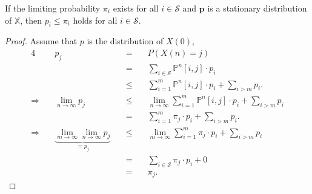 \begin{inequality} \label{ineq:p-le-pi}
If the limiting probability $ \pi_{i} $ exists for all $ i \in \mathcal{S} $ and $ \mathbf{p} $ is a stationary distribution of $ \mathbb{X} $, then $ p_{i} \le \pi_{i} $ holds for all $ i \in \mathcal{S} $.

\begin{proof}
Assume that $ p $ is the distribution of $ X(0) $,
\begin{alignat*}{4}
  & p_{j}
    & \quad=\quad & P(X(n) = j) \\
  & & \quad=\quad & \sum_{i \in \mathcal{S}} \mathbb{P}^{n}[i, j] \cdot p_{i} \\
  & & \quad\le\quad & \sum_{i = 1}^{m} \mathbb{P}^{n}[i, j] \cdot p_{i} + \sum_{i > m} p_{i}. \\
\Rightarrow\quad
  & \lim_{n \to \infty} p_{j}
    & \quad\le\quad & \lim_{n \to \infty} \sum_{i = 1}^{m} \mathbb{P}^{n}[i, j] \cdot p_{i} + \sum_{i > m} p_{i} \\
  & & \quad=\quad & \sum_{i = 1}^{m} \pi_{j} \cdot p_{i} + \sum_{i > m} p_{i}. \\
\Rightarrow\quad
  & \underbrace{\lim_{m \to \infty} \lim_{n \to \infty} p_{j}}_{= p_{j}}
    & \quad\le\quad & \lim_{m \to \infty} \sum_{i = 1}^{m} \pi_{j} \cdot p_{i} + \sum_{i > m} p_{i} \\
  & & \quad=\quad & \sum_{i \in \mathcal{S}} \pi_{j} \cdot p_{i} + 0 \\
  & & \quad=\quad & \pi_{j}.
\end{alignat*}
\end{proof}
\end{inequality}

